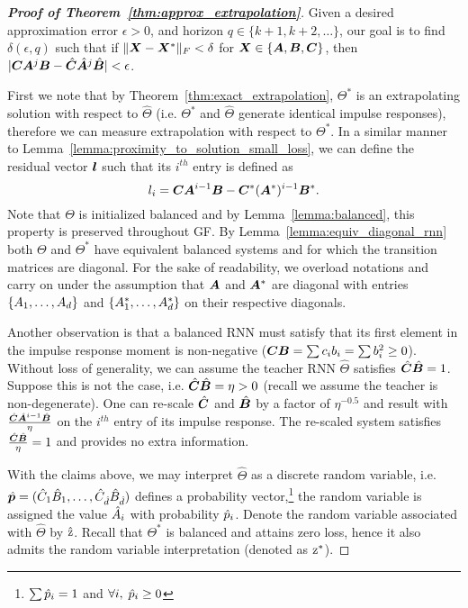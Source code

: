 \begin{proof}[\textbf{Proof of Theorem~\ref{thm:approx_extrapolation}}]
Given a desired approximation error $\epsilon>0$, and horizon $q\in\{k+1,k+2,\dots\}$, our goal is to find $\delta(\epsilon,q)$ such that if $\|{\bm{X}}-{\bm{X}}^*\|_F<\delta$ for ${\bm{X}}\in\{{\bm{A}},{\bm{B}},{\bm{C}}\}$, then $|{\bm{C}}{\bm{A}}^j{\bm{B}}-\hat{{\bm{C}}}\hat{{\bm{A}}}^j\hat{{\bm{B}}}|<\epsilon$.




First we note that by Theorem~\ref{thm:exact_extrapolation}, $\Theta^*$ is an extrapolating solution with respect to $\hat{\Theta}$ (i.e. $\Theta^*$ and $\hat{\Theta}$ generate identical impulse responses), therefore we can measure extrapolation with respect to $\Theta^*$.
In a similar manner to Lemma~\ref{lemma:proximity_to_solution_small_loss}, we can define the residual vector ${\bm{l}}$ such that its $i^{th}$ entry is defined as
\begin{equation}
    {l}_i={\bm{C}}{\bm{A}}^{i-1}{\bm{B}}-{\bm{C}}^*({\bm{A}}^*)^{i-1}{\bm{B}}^*.
\end{equation}
Note that $\Theta$ is initialized balanced and by Lemma~\ref{lemma:balanced}, this property is preserved throughout GF. By Lemma~\ref{lemma:equiv_diagonal_rnn} both $\Theta$ and $\Theta^*$ have equivalent balanced systems \smash{$\bar{\Theta}$} and \smash{$\bar{\Theta}^*$} for which the transition matrices are diagonal. For the sake of readability, we overload notations and carry on under the assumption that ${\bm{A}}$ and ${\bm{A}}^*$ are diagonal with entries $\{{A}_1,\dots,{A}_d\}$ and $\{{A}_1^*,\dots,{A}_d^*\}$ on their respective diagonals.

Another observation is that a balanced RNN must satisfy that its first element in the impulse response moment is non-negative (${\bm{C}}{\bm{B}}=\sum c_ib_i=\sum b_i^2\ge 0$). Without loss of generality, we can assume the teacher RNN $\hat{\Theta}$ satisfies $\hat{{\bm{C}}}\hat{{\bm{B}}}=1$. Suppose this is not the case, i.e. $\hat{{\bm{C}}}\hat{{\bm{B}}}=\eta>0$ (recall we assume the teacher is non-degenerate). One can re-scale $\hat{{\bm{C}}}$ and $\hat{{\bm{B}}}$ by a factor of $\eta^{-0.5}$ and result with $\frac{\hat{{\bm{C}}}\hat{{\bm{A}}}^{i-1}\hat{{\bm{B}}}}{\eta}$ on the $i^{th}$ entry of its impulse response. The re-scaled system satisfies $\frac{\hat{{\bm{C}}}\hat{{\bm{B}}}}{\eta}=1$ and provides no extra information.

With the claims above, we may interpret $\hat{\Theta}$ as a discrete random variable, i.e. $\hat{{\bm{p}}}=(\hat{{C}}_1\hat{{B}}_1,\dots, \hat{{C}}_{\hat{d}}\hat{{B}}_{\hat{d}})$ defines a probability vector,\footnote{$\sum \hat{{p}}_i=1$ and $\forall i,\; \hat{{p}}_i\ge 0$} the random variable is assigned the value $\hat{{A}}_i$ with probability $\hat{{p}}_i$. Denote the random variable associated with $\hat{\Theta}$ by $\hat{{\textnormal{z}}}$. Recall that $\Theta^*$ is balanced and attains zero loss, hence it also admits the random variable interpretation (denoted as ${\textnormal{z}}^*$).


\end{proof}
